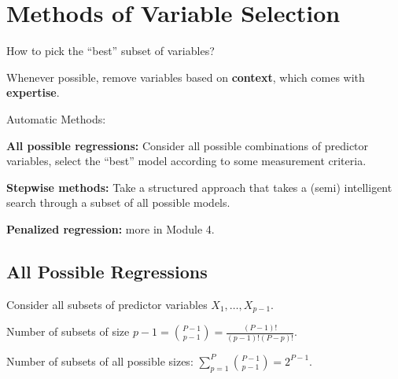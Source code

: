 \documentclass[12pt]{notes}
\begin{document}
\begin{minipage}[l][3cm][c]{\textwidth}

\end{minipage}

\section{Methods of Variable Selection}
How to pick the ``best'' subset of variables? 
\bi
\item Whenever possible, remove variables based on \textbf{context}, which comes with \textbf{expertise}.
\item Automatic Methods:
\bi
\item \textbf{All possible regressions:} Consider all possible combinations of predictor variables, select the ``best'' model according to some measurement criteria.  
\item \textbf{Stepwise methods:} Take a structured approach that takes a (semi) intelligent search through a subset of all possible models. 
\item \textbf{Penalized regression:} more in Module 4. 
\ei 
\ei

\subsection{All Possible Regressions}
Consider all subsets of predictor variables $X_1,  \ldots , X_{p-1}$. 

\bi
\item Number of subsets of size $p-1 = \binom{P-1}{p-1} = \frac{(P-1)!}{(p-1)!(P-p)!}$.
\item Number of subsets of all possible sizes: $\sum_{p=1}^P \binom{P-1}{p-1} = 2^{P-1}$.
\ei
\end{document}
